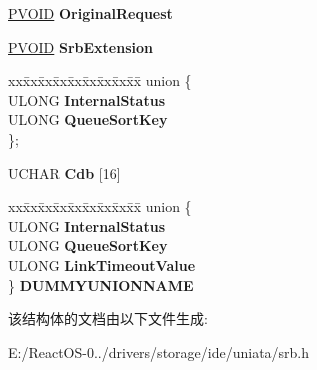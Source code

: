 \begin{DoxyCompactItemize}
\hyperlink{interfacevoid}{P\+V\+O\+ID} {\bfseries Original\+Request}
\item 
\mbox{\label{struct___s_c_s_i___r_e_q_u_e_s_t___b_l_o_c_k_ab06befe17d4296adae967a22267dbf45}} 
\hyperlink{interfacevoid}{P\+V\+O\+ID} {\bfseries Srb\+Extension}
\item 
\mbox{\label{struct___s_c_s_i___r_e_q_u_e_s_t___b_l_o_c_k_a38a8817d6dd781a4342cb398a57518bf}} 
\begin{tabbing}
xx\=xx\=xx\=xx\=xx\=xx\=xx\=xx\=xx\=\kill
union \{\\
\>ULONG {\bfseries InternalStatus}\\
\>ULONG {\bfseries QueueSortKey}\\
\}; \\

\end{tabbing}\item 
\mbox{\label{struct___s_c_s_i___r_e_q_u_e_s_t___b_l_o_c_k_a6848814baa32938d0501d1307cdd1b0e}} 
U\+C\+H\+AR {\bfseries Cdb} \mbox{[}16\mbox{]}
\item 
\mbox{\label{struct___s_c_s_i___r_e_q_u_e_s_t___b_l_o_c_k_a770ab2f987945046fe95e3d86897f6e8}} 
\begin{tabbing}
xx\=xx\=xx\=xx\=xx\=xx\=xx\=xx\=xx\=\kill
union \{\\
\>ULONG {\bfseries InternalStatus}\\
\>ULONG {\bfseries QueueSortKey}\\
\>ULONG {\bfseries LinkTimeoutValue}\\
\} {\bfseries DUMMYUNIONNAME}\\

\end{tabbing}\end{DoxyCompactItemize}


该结构体的文档由以下文件生成\+:\begin{DoxyCompactItemize}
\item 
E\+:/\+React\+O\+S-\/0../drivers/storage/ide/uniata/srb.\+h\end{DoxyCompactItemize}
